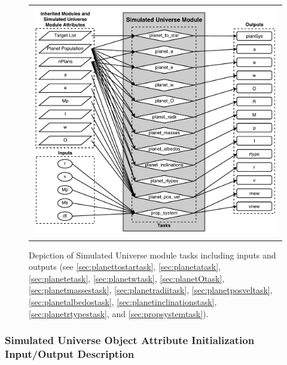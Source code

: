 \documentclass[cleanfoot]{asme2ej}
\begin{document}
\begin{figure}[ht]
    \begin{center}
        \begin{tabular}{c}
             \includegraphics[width=\textwidth]{SimulatedUniverseTasks}
        \end{tabular}
    \end{center}
    \caption{\label{fig:simulateduniversemodule} Depiction of Simulated Universe module tasks including inputs and outputs (see \ref{sec:planettostartask}, \ref{sec:planetatask}, \ref{sec:planetetask}, \ref{sec:planetwtask}, \ref{sec:planetOtask}, \ref{sec:planetmassestask}, \ref{sec:planetradiitask}, \ref{sec:planetposveltask}, \ref{sec:planetalbedostask}, \ref{sec:planetinclinationstask}, \ref{sec:planetrtypestask}, and \ref{sec:propsystemtask}).}
\end{figure}

\subsubsection{Simulated Universe Object Attribute Initialization Input/Output Description}
\end{document}
